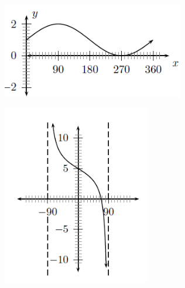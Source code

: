 \begin{enumerate}[noitemsep, label=\textbf{\arabic*}. ]
\begin{figure}[H]
\begin{center}
      \vspace{2pt}
    \vspace{.1in}
    
    \end{center}

 \end{figure}   

    \addtocounter{footnote}{-0}
    
    \setcounter{subfigure}{0}


	\begin{figure}[H] %
    \begin{center}
    \label{m39414*id92162!!!underscore!!!media}\label{m39414*id92162!!!underscore!!!printimage}\includegraphics[width=300px]{col11306.imgs/m39414_trigrep5.png} %
        
      \vspace{2pt}
    \vspace{.1in}
    
    \end{center}

 \end{figure}   

    \addtocounter{footnote}{-0}
    
    \setcounter{subfigure}{0}


	\begin{figure}[H] %
    \begin{center}
    \label{m39414*id92174!!!underscore!!!media}\label{m39414*id92174!!!underscore!!!printimage}\includegraphics[height=300px]{col11306.imgs/m39414_trigrep6.png} %
        

\end{center}
\end{figure}
\end{enumerate}
